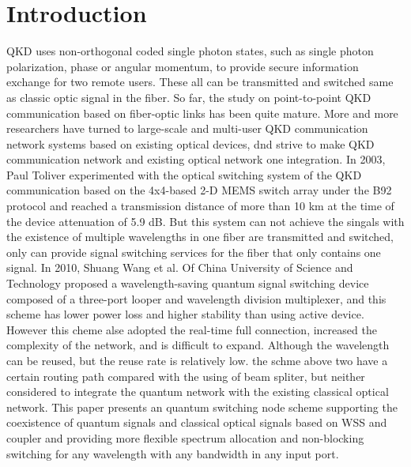 \documentclass[letterpaper,10pt]{article}
\begin{document}
\section{Introduction}
QKD uses non-orthogonal coded single photon states, such as single photon polarization, phase or angular momentum, to provide secure information exchange for two remote users. These all can be transmitted and switched same as classic optic signal in the fiber. So far, the study on point-to-point QKD communication based on fiber-optic links has been quite mature. More and more researchers have turned to large-scale and multi-user QKD communication network systems based on existing optical devices, dnd strive to make QKD communication network and existing optical network one integration. In 2003, Paul Toliver experimented with the optical switching system of the QKD communication based on the 4x4-based 2-D MEMS switch array under the B92 protocol and reached a transmission distance of more than 10 km at the time of the device attenuation of 5.9 dB. But this system can not achieve the singals with the existence of multiple wavelengths in one fiber are transmitted and switched, only can provide signal switching services for the fiber that only contains one signal.  In 2010, Shuang Wang et al. Of China University of Science and Technology proposed a wavelength-saving quantum signal switching device composed of a three-port looper and wavelength division multiplexer, and this scheme has lower power loss and higher stability than using active device.  However this cheme alse adopted the real-time full connection, increased the complexity of the network, and is difficult to expand. Although the wavelength can be reused, but the reuse rate is relatively low. the schme above two have a certain routing path compared with the using of beam spliter, but neither considered to integrate the quantum network with the existing classical optical network. This paper presents an quantum switching node scheme supporting the coexistence of quantum signals and classical optical signals based on WSS and coupler and providing more flexible spectrum allocation and non-blocking switching for any wavelength with any bandwidth in any input port.
\end{document}
